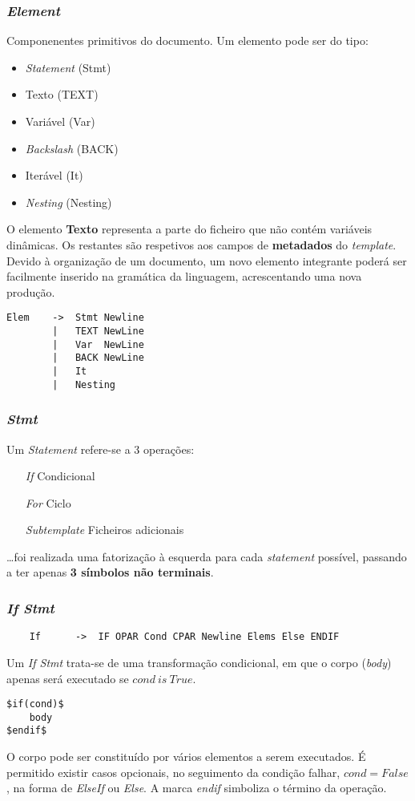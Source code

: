 \documentclass[../relatorio.tex]{subfiles}
\begin{document}
\subsubsection{\textit{Element}}\label{grm:elem}
Componenentes primitivos do documento. 
Um elemento pode ser do tipo:
\begin{itemize}
    \item \textit{Statement}    (Stmt)
    \item Texto                 (TEXT)
    \item Variável              (Var)
    \item \textit{Backslash}    (BACK)
    \item Iterável              (It)
    \item \textit{Nesting}      (Nesting)
\end{itemize}

O elemento \textbf{Texto} representa a parte do 
ficheiro que não contém variáveis dinâmicas.
Os restantes são respetivos aos campos de \textbf{metadados} do \textit{template}.
Devido à organização de um documento, um novo elemento integrante 
poderá ser facilmente inserido na gramática da linguagem, acrescentando uma nova produção.

\begin{verbatim}
Elem    ->  Stmt Newline
        |   TEXT NewLine
        |   Var  NewLine
        |   BACK NewLine
        |   It
        |   Nesting
\end{verbatim}

\subsubsection{\textit{Stmt}}\label{grm:stmt}
Um \textit{Statement} refere-se a 3 operações:
\begin{enumerate}
    \item[\textit{If}]         {Condicional}
    \item[\textit{For}]        {Ciclo}
    \item[\textit{Subtemplate}]{Ficheiros adicionais}
\end{enumerate}
\dots foi realizada uma fatorização à esquerda para cada 
\textit{statement} possível, passando a ter apenas 
\textbf{3 símbolos não terminais}.

\subsubsection*{\textit{If Stmt}} \label{grm:ifstmt}
\begin{verbatim}
    If      ->  IF OPAR Cond CPAR Newline Elems Else ENDIF
\end{verbatim}
Um \textit{If Stmt} trata-se de uma transformação
condicional, em que o corpo (\textit{body}) apenas será executado
se $cond\ is\ True$.
\begin{verbatim}    
$if(cond)$
    body
$endif$
\end{verbatim}
O corpo pode ser constituído por vários elementos a serem executados.
É permitido existir casos opcionais, no seguimento da condição falhar, 
$cond=False$, na forma de \textit{ElseIf} ou \textit{Else}.
A marca \textit{endif} simboliza o término da operação.
\end{document}
